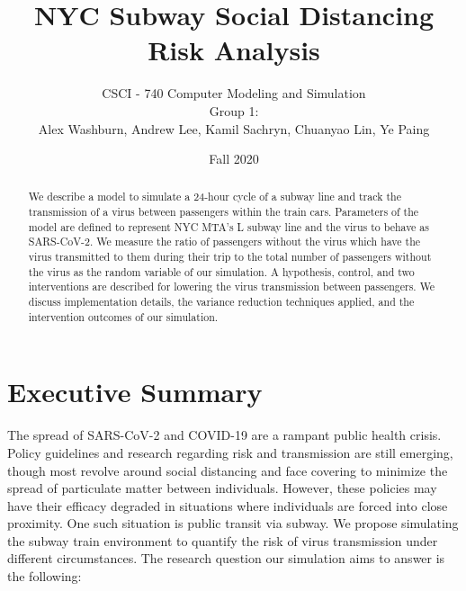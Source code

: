 \documentclass[12pt]{article}
\begin{document}
\lhead{ } \chead{ } \rhead{ } \lfoot{ }  \rfoot{ }                                            %

\title{\bfseries NYC Subway Social Distancing Risk Analysis}
\author{CSCI - 740 Computer Modeling and Simulation\vspace*{0.5em} \\ \vspace*{0.5em} Group 1:\\
Alex Washburn, Andrew Lee, Kamil Sachryn,  Chuanyao Lin, Ye Paing
}
\date{Fall 2020}

\maketitle

\begin{abstract}
	We describe a model to simulate a 24-hour cycle of a subway line and track the transmission of a virus between passengers within the train cars.
	Parameters of the model are defined to represent NYC MTA's L subway line and the virus to behave as SARS-CoV-2.
	We measure the ratio of passengers without the virus which have the virus transmitted to them during their trip to the total number of passengers without the virus as the random variable of our simulation.
	A hypothesis, control, and two interventions are described for lowering the virus transmission between passengers.
	We discuss implementation details, the variance reduction techniques applied, and the intervention outcomes of our simulation.
\end{abstract}

\clearpage

\section{Executive Summary}

The spread of SARS-CoV-2 and COVID-19 are a rampant public health crisis.
Policy guidelines and research regarding risk and transmission are still emerging, though most revolve around social distancing and face covering to minimize the spread of particulate matter between individuals.
However, these policies may have their efficacy degraded in situations where individuals are forced into close proximity.
One such situation is public transit via subway.
We propose simulating the subway train environment to quantify the risk of virus transmission under different circumstances.
The research question our simulation aims to answer is the following:
\end{document}
